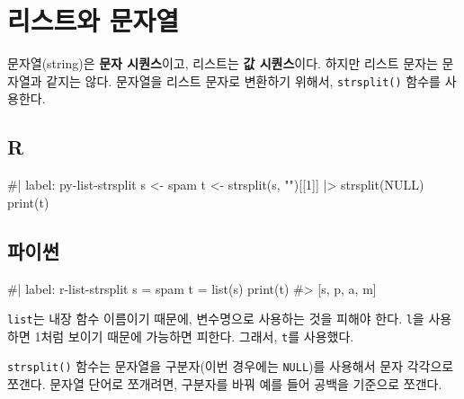 \documentclass[
  letterpaper,
]{book}
\newenvironment{Shaded}{\begin{snugshade}}{\end{snugshade}}
\newcommand{\NormalTok}[1]{\textcolor[rgb]{0.00,0.23,0.31}{#1}}
\begin{document}
\section{리스트와 문자열}\label{r-list-string}

  

문자열(string)은 \textbf{문자 시퀀스}이고, 리스트는 \textbf{값
시퀀스}이다. 하지만 리스트 문자는 문자열과 같지는 않다. 문자열을 리스트
문자로 변환하기 위해서, \texttt{strsplit()} 함수를 사용한다.
 

\subsection{R}

\begin{Shaded}
\begin{Highlighting}[]
\NormalTok{\#| label: py{-}list{-}strsplit}
\NormalTok{s \textless{}{-} \textquotesingle{}spam\textquotesingle{}}
\NormalTok{t \textless{}{-} strsplit(s, "")[[1]] |\textgreater{}  strsplit(NULL)}
\NormalTok{print(t)}
\end{Highlighting}
\end{Shaded}

\subsection{파이썬}

\begin{Shaded}
\begin{Highlighting}[]
\NormalTok{\#| label: r{-}list{-}strsplit}
\NormalTok{s = \textquotesingle{}spam\textquotesingle{}}
\NormalTok{t = list(s)}
\NormalTok{print(t)}
\NormalTok{\#\textgreater{} [\textquotesingle{}s\textquotesingle{}, \textquotesingle{}p\textquotesingle{}, \textquotesingle{}a\textquotesingle{}, \textquotesingle{}m\textquotesingle{}]}
\end{Highlighting}
\end{Shaded}

\texttt{list}는 내장 함수 이름이기 때문에, 변수명으로 사용하는 것을
피해야 한다. \texttt{l}을 사용하면 1처럼 보이기 때문에 가능하면 피한다.
그래서, \texttt{t}를 사용했다.

\texttt{strsplit()} 함수는 문자열을 구분자(이번 경우에는
\texttt{NULL})를 사용해서 문자 각각으로 쪼갠다. 문자열 단어로 쪼개려면,
구분자를 바꿔 예를 들어 공백을 기준으로 쪼갠다. 
\end{document}
